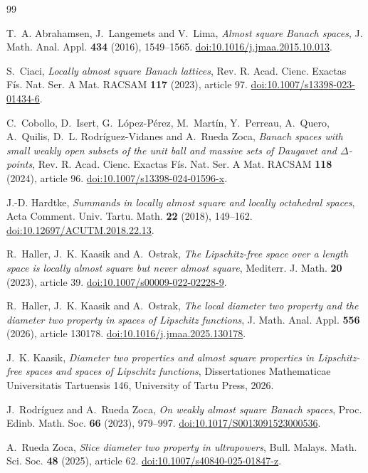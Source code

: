 \documentclass[11pt]{article}
\begin{document}
\begin{thebibliography}{99}

T.~A. Abrahamsen, J.~Langemets and V.~Lima,
\emph{Almost square Banach spaces},
J. Math. Anal. Appl. \textbf{434} (2016), 1549--1565.
\href{https://doi.org/10.1016/j.jmaa.2015.10.013}{doi:10.1016/j.jmaa.2015.10.013}.

S.~Ciaci,
\emph{Locally almost square Banach lattices},
Rev. R. Acad. Cienc. Exactas F\'is. Nat. Ser. A Mat. RACSAM \textbf{117} (2023), article 97.
\href{https://doi.org/10.1007/s13398-023-01434-6}{doi:10.1007/s13398-023-01434-6}.

C.~Cobollo, D.~Isert, G.~L\'opez-P\'erez, M.~Mart\'in, Y.~Perreau, A.~Quero,
A.~Quilis, D.~L. Rodr\'iguez-Vidanes and A.~Rueda Zoca,
\emph{Banach spaces with small weakly open subsets of the unit ball and massive sets of Daugavet and $\Delta$-points},
Rev. R. Acad. Cienc. Exactas F\'is. Nat. Ser. A Mat. RACSAM \textbf{118} (2024), article 96.
\href{https://doi.org/10.1007/s13398-024-01596-x}{doi:10.1007/s13398-024-01596-x}.

J.-D. Hardtke,
\emph{Summands in locally almost square and locally octahedral spaces},
Acta Comment. Univ. Tartu. Math. \textbf{22} (2018), 149--162.
\href{https://doi.org/10.12697/ACUTM.2018.22.13}{doi:10.12697/ACUTM.2018.22.13}.

R.~Haller, J.~K. Kaasik and A.~Ostrak,
\emph{The Lipschitz-free space over a length space is locally almost square but never almost square},
Mediterr. J. Math. \textbf{20} (2023), article 39.
\href{https://doi.org/10.1007/s00009-022-02228-9}{doi:10.1007/s00009-022-02228-9}.

R.~Haller, J.~K. Kaasik and A.~Ostrak,
\emph{The local diameter two property and the diameter two property in spaces of Lipschitz functions},
J. Math. Anal. Appl. \textbf{556} (2026), article 130178.
\href{https://doi.org/10.1016/j.jmaa.2025.130178}{doi:10.1016/j.jmaa.2025.130178}.

J.~K. Kaasik,
\emph{Diameter two properties and almost square properties in Lipschitz-free spaces and spaces of Lipschitz functions},
Dissertationes Mathematicae Universitatis Tartuensis 146, University of Tartu Press, 2026.

J.~Rodr\'iguez and A.~Rueda Zoca,
\emph{On weakly almost square Banach spaces},
Proc. Edinb. Math. Soc. \textbf{66} (2023), 979--997.
\href{https://doi.org/10.1017/S0013091523000536}{doi:10.1017/S0013091523000536}.

A.~Rueda Zoca,
\emph{Slice diameter two property in ultrapowers},
Bull. Malays. Math. Sci. Soc. \textbf{48} (2025), article 62.
\href{https://doi.org/10.1007/s40840-025-01847-z}{doi:10.1007/s40840-025-01847-z}.

\end{thebibliography}
\end{document}
